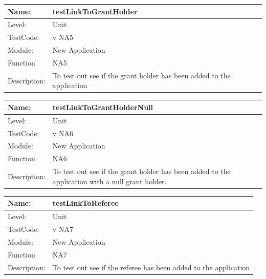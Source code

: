 \documentclass[12pt]{article}
\begin{document}
\begin{center}
\begin{tabular}{|l|p{12cm}|}
\hline

 Name: & testLinkToGrantHolder  \\
\hline
Level: & Unit \\
\hline
TestCode: & v NA5 \\
\hline
Module:& New Application\\
\hline
Function & NA5 \\
\hline
Description: & To test out see if the grant holder has been added to the application  \\
\hline

\end{tabular}
\end{center}

\begin{center}
\begin{tabular}{|l|p{12cm}|}
\hline

 Name: & testLinkToGrantHolderNull  \\
\hline
Level: & Unit \\
\hline
TestCode: & v NA6 \\
\hline
Module:& New Application\\
\hline
Function & NA6 \\
\hline
Description: & To test out see if the grant holder has been added to the application with a null grant holder.  \\
\hline

\end{tabular}
\end{center}

\begin{center}
\begin{tabular}{|l|p{12cm}|}
\hline

 Name: & testLinkToReferee  \\
\hline
Level: & Unit \\
\hline
TestCode: & v NA7 \\
\hline
Module:& New Application\\
\hline
Function & NA7 \\
\hline
Description: & To test out see if the referee has been added to the application  \\
\hline

\end{tabular}
\end{center}
\end{document}
